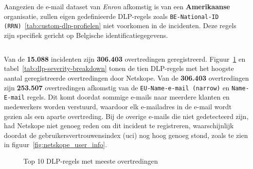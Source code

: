 Aangezien de e-mail dataset van \textit{Enron} afkomstig is van een \textbf{Amerikaanse} organisatie, 
zullen eigen gedefinieerde DLP-regels zoals \texttt{BE-National-ID (RRN)}~\ref{tab:custom-dlp-profielen} niet voorkomen in de incidenten.
Deze regels zijn specifiek gericht op Belgische identificatiegegevens.



\subsection{}
\label{subsec:dlp-violations-per-rule}


Van de \textbf{15.088} incidenten zijn \textbf{306.403} overtredingen geregistreerd.
Figuur~\ref{fig:top-10-dlp-rules} en tabel~\ref{tab:dlp-severity-breakdown} tonen de tien DLP-regels met het hoogste aantal geregistreerde overtredingen door Netskope. 
Van de \textbf{306.403} overtredingen zijn \textbf{253.507} overtredingen afkomstig van de \texttt{EU-Name-e-mail (narrow)} en \texttt{Name-E-mail} regels.
Dit komt doordat sommige e-mails naar meerdere klanten en medewerkers worden verstuurd, waardoor elk e-mailadres in de e-mail wordt gezien als een aparte overtreding.
Bij de overige e-mails die niet gedetecteerd zijn, had Netskope niet genoeg reden om dit incident te registreren, 
waarschijnlijk doordat de gebruikersvertrouwensindex (\gls{uci}) nog hoog genoeg stond, zoals te zien in figuur~\ref{fig:netskope_user_info}.


\begin{figure}[H]
  \centering
  \scriptsize
  \caption{Top 10 DLP-regels met meeste overtredingen}
  \label{fig:top-10-dlp-rules}
\end{figure}

